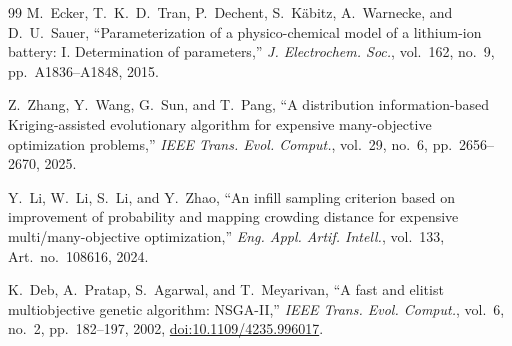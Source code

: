 \documentclass[lettersize,journal]{IEEEtran}
\begin{document}
\begin{thebibliography}{99}
M.~Ecker, T.~K.~D.~Tran, P.~Dechent,
S.~K\"abitz, A.~Warnecke, and D.~U.~Sauer,
``Parameterization of a physico-chemical model of a lithium-ion
battery: I. Determination of parameters,''
\textit{J. Electrochem. Soc.},
vol.~162, no.~9, pp.~A1836--A1848, 2015.

Z.~Zhang, Y.~Wang, G.~Sun, and T.~Pang,
``A distribution information-based Kriging-assisted evolutionary
algorithm for expensive many-objective optimization problems,''
\textit{IEEE Trans. Evol. Comput.},
vol.~29, no.~6, pp.~2656--2670, 2025.

Y.~Li, W.~Li, S.~Li, and Y.~Zhao,
``An infill sampling criterion based on improvement of probability
and mapping crowding distance for expensive multi/many-objective
optimization,''
\textit{Eng. Appl. Artif. Intell.},
vol.~133, Art.~no.~108616, 2024.

K.~Deb, A.~Pratap, S.~Agarwal, and T.~Meyarivan,
``A fast and elitist multiobjective genetic algorithm: NSGA-II,''
\textit{IEEE Trans. Evol. Comput.},
vol.~6, no.~2, pp.~182--197, 2002,
\href{https://doi.org/10.1109/4235.996017}
{doi:10.1109/4235.996017}.

\end{thebibliography}
\end{document}
